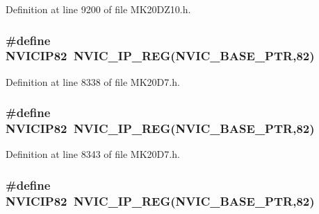 Definition at line 9200 of file M\+K20\+D\+Z10.\+h.

\subsubsection[{\texorpdfstring{N\+V\+I\+C\+I\+P82}{NVICIP82}}]{\setlength{\rightskip}{0pt plus 5cm}\#define N\+V\+I\+C\+I\+P82~{\bf N\+V\+I\+C\+\_\+\+I\+P\+\_\+\+R\+EG}({\bf N\+V\+I\+C\+\_\+\+B\+A\+S\+E\+\_\+\+P\+TR},82)}\hypertarget{group___n_v_i_c___register___accessor___macros_gac78ca43d0cbd67dc6cde73df62f51b38}{}\label{group___n_v_i_c___register___accessor___macros_gac78ca43d0cbd67dc6cde73df62f51b38}


Definition at line 8338 of file M\+K20\+D7.\+h.

\subsubsection[{\texorpdfstring{N\+V\+I\+C\+I\+P82}{NVICIP82}}]{\setlength{\rightskip}{0pt plus 5cm}\#define N\+V\+I\+C\+I\+P82~{\bf N\+V\+I\+C\+\_\+\+I\+P\+\_\+\+R\+EG}({\bf N\+V\+I\+C\+\_\+\+B\+A\+S\+E\+\_\+\+P\+TR},82)}\hypertarget{group___n_v_i_c___register___accessor___macros_gac78ca43d0cbd67dc6cde73df62f51b38}{}\label{group___n_v_i_c___register___accessor___macros_gac78ca43d0cbd67dc6cde73df62f51b38}


Definition at line 8343 of file M\+K20\+D7.\+h.

\subsubsection[{\texorpdfstring{N\+V\+I\+C\+I\+P82}{NVICIP82}}]{\setlength{\rightskip}{0pt plus 5cm}\#define N\+V\+I\+C\+I\+P82~{\bf N\+V\+I\+C\+\_\+\+I\+P\+\_\+\+R\+EG}({\bf N\+V\+I\+C\+\_\+\+B\+A\+S\+E\+\_\+\+P\+TR},82)}\hypertarget{group___n_v_i_c___register___accessor___macros_gac78ca43d0cbd67dc6cde73df62f51b38}{}\label{group___n_v_i_c___register___accessor___macros_gac78ca43d0cbd67dc6cde73df62f51b38}


